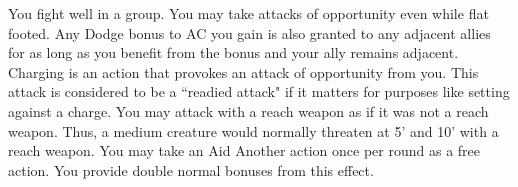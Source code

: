 \combatfeat
{You fight well in a group.}
{You may take attacks of opportunity even while flat footed.}
{Any Dodge bonus to AC you gain is also granted to any adjacent allies for as long as you benefit from the bonus and your ally remains adjacent.}
{Charging is an action that provokes an attack of opportunity from you. This attack is considered to be a ``readied attack" if it matters for purposes like setting against a charge.}
{You may attack with a reach weapon as if it was not a reach weapon. Thus, a medium creature would normally threaten at 5' and 10' with a reach weapon.}
{You may take an Aid Another action once per round as a free action. You provide double normal bonuses from this effect.}